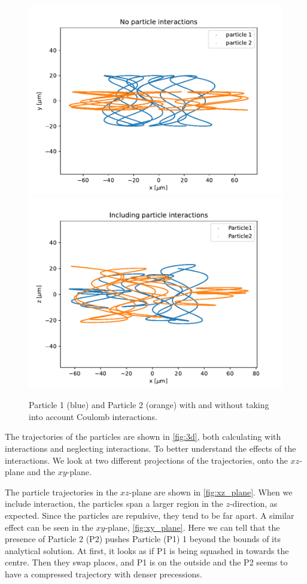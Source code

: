 \begin{figure}
\centering
\includegraphics[scale=0.7]{../figures/xz_plane_noint.pdf}
\includegraphics[scale=0.7]{../figures/xz_plane_int.pdf}
\caption{Particle 1 (blue) and Particle 2 (orange) with and without taking into account Coulomb interactions.}
\label{fig:xz_plane}
\end{figure}

The trajectories of the particles are shown in \autoref{fig:3d}, both calculating with interactions and
neglecting interactions. To better understand the effects of the interactions. We look at two
different projections of the trajectories, onto the $xz$-plane and the $xy$-plane.

The particle trajectories in the $xz$-plane are shown in \autoref{fig:xz_plane}. When we include interaction, the particles span a larger region in the $z$-direction, as expected. Since the particles
are repulsive, they tend to be far apart. A similar effect can be seen
in the $xy$-plane, \autoref{fig:xy_plane}. Here we can tell that the presence of Particle 2 (P2)
pushes Particle (P1) 1 beyond the bounds of its analytical solution. At first, it looks as if P1
is being squashed in towards the centre. Then they swap places, and P1 is on the outside and the
P2 seems to have a compressed trajectory with denser precessions.

